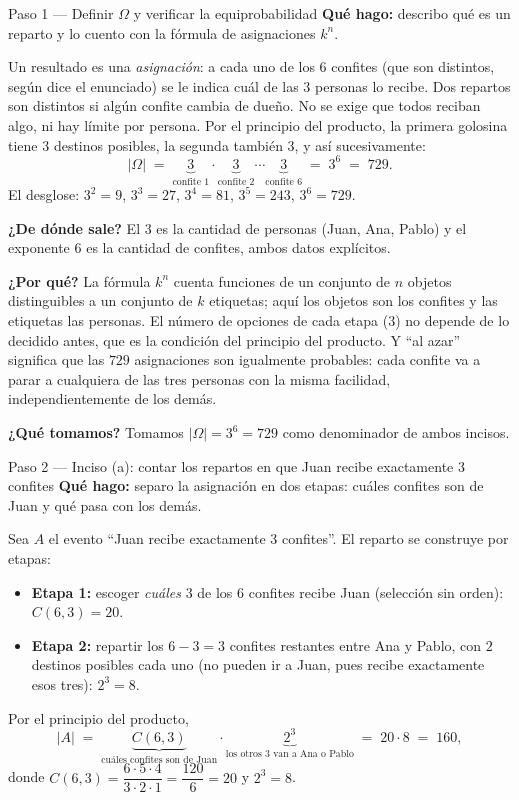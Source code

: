 \documentclass[11pt]{article}
\begin{document}
\begin{sol}

\begin{paso}{Paso 1 --- Definir $\Omega$ y verificar la equiprobabilidad}
\textbf{Qu\'e hago:} describo qu\'e es un reparto y lo cuento con la f\'ormula de asignaciones $k^{n}$.

Un resultado es una \emph{asignaci\'on}: a cada uno de los $6$ confites (que son distintos, seg\'un dice el enunciado) se le indica cu\'al de las $3$ personas lo recibe. Dos repartos son distintos si alg\'un confite cambia de due\~no. No se exige que todos reciban algo, ni hay l\'imite por persona. Por el principio del producto, la primera golosina tiene $3$ destinos posibles, la segunda tambi\'en $3$, y as\'i sucesivamente:
\[
|\Omega| \;=\; \underbrace{3}_{\text{confite 1}}\cdot\underbrace{3}_{\text{confite 2}}\cdots\underbrace{3}_{\text{confite 6}}
\;=\; 3^{6} \;=\; 729 .
\]
El desglose: $3^{2}=9$, $3^{3}=27$, $3^{4}=81$, $3^{5}=243$, $3^{6}=729$.

\textbf{¿De d\'onde sale?} El $3$ es la cantidad de personas (Juan, Ana, Pablo) y el exponente $6$ es la cantidad de confites, ambos datos expl\'icitos.

\textbf{¿Por qu\'e?} La f\'ormula $k^{n}$ cuenta funciones de un conjunto de $n$ objetos distinguibles a un conjunto de $k$ etiquetas; aqu\'i los objetos son los confites y las etiquetas las personas. El n\'umero de opciones de cada etapa ($3$) no depende de lo decidido antes, que es la condici\'on del principio del producto. Y ``al azar'' significa que las $729$ asignaciones son igualmente probables: cada confite va a parar a cualquiera de las tres personas con la misma facilidad, independientemente de los dem\'as.

\textbf{¿Qu\'e tomamos?} Tomamos $|\Omega|=3^{6}=729$ como denominador de ambos incisos.
\end{paso}

\begin{paso}{Paso 2 --- Inciso (a): contar los repartos en que Juan recibe exactamente 3 confites}
\textbf{Qu\'e hago:} separo la asignaci\'on en dos etapas: cu\'ales confites son de Juan y qu\'e pasa con los dem\'as.

Sea $A$ el evento ``Juan recibe exactamente $3$ confites''. El reparto se construye por etapas:
\begin{itemize}[leftmargin=*]
  \item \textbf{Etapa 1:} escoger \emph{cu\'ales} $3$ de los $6$ confites recibe Juan (selecci\'on sin orden): $C(6,3)=20$.
  \item \textbf{Etapa 2:} repartir los $6-3=3$ confites restantes entre Ana y Pablo, con $2$ destinos posibles cada uno (no pueden ir a Juan, pues recibe exactamente esos tres): $2^{3}=8$.
\end{itemize}
Por el principio del producto,
\[
|A| \;=\; \underbrace{C(6,3)}_{\text{cu\'ales confites son de Juan}}\cdot\underbrace{2^{3}}_{\text{los otros 3 van a Ana o Pablo}}
\;=\; 20\cdot 8 \;=\; 160 ,
\]
donde $C(6,3)=\dfrac{6\cdot 5\cdot 4}{3\cdot 2\cdot 1}=\dfrac{120}{6}=20$ y $2^{3}=8$.


\end{paso}
\end{sol}
\end{document}
